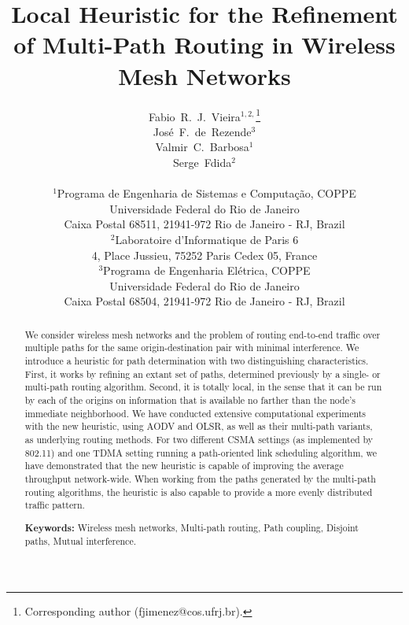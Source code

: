 \documentclass{article}
\begin{document}
\title{Local Heuristic for the Refinement of Multi-Path Routing in Wireless Mesh
Networks}

\author{Fabio~R.~J.~Vieira$^{1,2,}$\thanks{Corresponding author (fjimenez@cos.ufrj.br).}\\
Jos\'e~F.~de~Rezende$^3$\\
Valmir~C.~Barbosa$^1$\\
Serge~Fdida$^2$\\
\\
$^1$Programa de Engenharia de Sistemas e Computa\c c\~ao, COPPE\\
Universidade Federal do Rio de Janeiro\\
Caixa Postal 68511, 21941-972 Rio de Janeiro - RJ, Brazil\\
$^2$Laboratoire d'Informatique de Paris 6\\
4, Place Jussieu, 75252 Paris Cedex 05, France\\
$^3$Programa de Engenharia El\'etrica, COPPE\\
Universidade Federal do Rio de Janeiro\\
Caixa Postal 68504, 21941-972 Rio de Janeiro - RJ, Brazil}

\date{}

\maketitle

\begin{abstract}
We consider wireless mesh networks and the problem of routing end-to-end traffic
over multiple paths for the same origin-destination pair with minimal
interference. We introduce a heuristic for path determination with two
distinguishing characteristics. First, it works by refining an extant set of
paths, determined previously by a single- or multi-path routing algorithm.
Second, it is totally local, in the sense that it can be run by each of the
origins on information that is available no farther than the node's immediate
neighborhood. We have conducted extensive computational experiments with the new
heuristic, using AODV and OLSR, as well as their multi-path variants, as
underlying routing methods. For two different CSMA settings (as implemented by
802.11) and one TDMA setting running a path-oriented link scheduling algorithm,
we have demonstrated that the new heuristic is capable of improving the average
throughput network-wide. When working from the paths generated by the multi-path
routing algorithms, the heuristic is also capable to provide a more evenly
distributed traffic pattern.

\bigskip
\noindent
\textbf{Keywords:} Wireless mesh networks, Multi-path routing, Path coupling,
Disjoint paths, Mutual interference.
\end{abstract}
\end{document}
